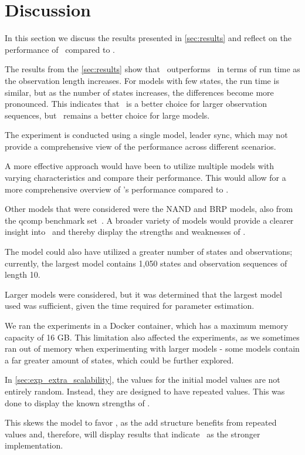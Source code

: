 \section{Discussion}\label{sec:discussion}
In this section we discuss the results presented in \autoref{sec:results} and reflect on the performance of \Cupaal\ compared to \Jajapy.

The results from the \autoref{sec:results} show that \Cupaal\ outperforms \Jajapy\ in terms of run time as the observation length increases.
For models with few states, the run time is similar, but as the number of states increases, the differences become more pronounced.
This indicates that \Cupaal\ is a better choice for larger observation sequences, but \Jajapy\ remains a better choice for large models.

The experiment is conducted using a single model, leader sync, which may not provide a comprehensive view of the performance across different scenarios.

A more effective approach would have been to utilize multiple models with varying characteristics and compare their performance.
This would allow for a more comprehensive overview of \Cupaal 's performance compared to \Jajapy.

Other models that were considered were the NAND and BRP models, also from the qcomp benchmark set~\cite{hartmanns2019quantitative}.
A broader variety of models would provide a clearer insight into \Cupaal\ and thereby display the strengths and weaknesses of \Cupaal.

The model could also have utilized a greater number of states and observations; currently, the largest model contains 1,050 states and observation sequences of length 10.

Larger models were considered, but it was determined that the largest model used was sufficient, given the time required for parameter estimation.

We ran the experiments in a Docker container, which has a maximum memory capacity of 16 GB. This limitation also affected the experiments, as we sometimes ran out of memory when experimenting with larger models - some models contain a far greater amount of states, which could be further explored.

In \autoref{sec:exp_extra_scalability}, the values for the initial model values are not entirely random. Instead, they are designed to have repeated values.
This was done to display the known strengths of \Cupaal.

This skews the model to favor \Cupaal, as the \gls{add} structure benefits from repeated values and, therefore, will display results that indicate \Cupaal\ as the stronger implementation.

